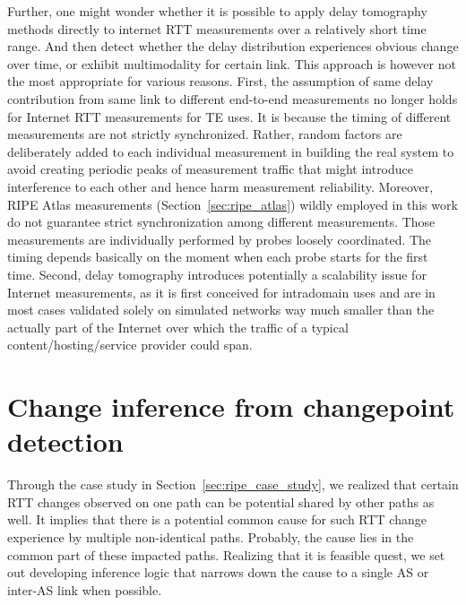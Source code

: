 Further, one might wonder whether it is possible to apply delay tomography methods directly to internet RTT measurements over a relatively short time range. And then detect whether the delay distribution experiences obvious change over time, or exhibit multimodality for certain link.
This approach is however not the most appropriate for various reasons. First, the assumption of
same delay contribution from same link to different end-to-end measurements no longer holds for Internet RTT measurements for TE uses. It is because the timing of different measurements are not strictly synchronized. Rather, random factors are deliberately added to each individual measurement in building the real system to avoid creating periodic peaks of measurement traffic that might introduce interference to each other and hence harm measurement reliability. Moreover,  RIPE Atlas measurements (Section~\ref{sec:ripe_atlas}) wildly employed in this work do not guarantee strict synchronization among different measurements.
Those measurements are individually performed by probes loosely coordinated. The timing depends basically on the moment when each probe starts for the first time.
Second, delay tomography introduces potentially a scalability issue for Internet measurements, as it is first conceived for intradomain uses and are in most cases validated solely on simulated networks way much smaller than the actually part of the Internet over which the traffic of a typical content/hosting/service provider could span.

\section{Change inference from changepoint detection}
\label{sec:inference}
Through the case study in Section~\ref{sec:ripe_case_study}, we realized that certain RTT changes observed on one path can be potential shared by other paths as well.
It implies that there is a potential common cause for such RTT change experience by multiple non-identical paths.
Probably, the cause lies in the common part of these impacted paths.
Realizing that it is feasible quest, we set out developing inference logic that narrows down the cause to a single AS or inter-AS link when possible.